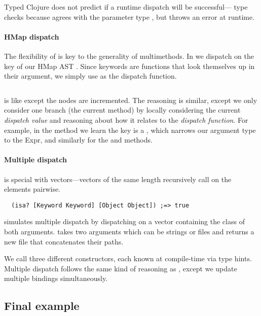 Typed Clojure does not predict if a runtime dispatch will be successful--- 
type checks because  agrees with the parameter type ,
but throws an error at runtime.

\paragraph{HMap dispatch} The flexibility of  is key to the generality of multimethods. 
In  we
dispatch on the  key 
of our HMap AST .
Since keywords are functions that look themselves up in their argument, we simply
use  as the dispatch function.

\begin{exmp}
\inputminted[firstline=5,lastline=18]{clojure}{code/demo/src/demo/eg5.clj}
\label{example:incmap}
\end{exmp}

 is like  except the nodes are incremented.
The reasoning is similar, except we only consider one branch (the current method) by
locally considering the current \emph{dispatch value} and reasoning about how it relates
to the \emph{dispatch function}.
For example, 
in the  method we learn the  key is a , which
narrows our argument type to the  Expr, and similarly for the 
and  methods.

\paragraph{Multiple dispatch}  is special with vectors---vectors of the
same length recursively call  on the elements pairwise.
\begin{verbatim}
  (isa? [Keyword Keyword] [Object Object]) ;=> true
\end{verbatim}

simulates multiple dispatch by dispatching on
a vector containing the class of both arguments. 
takes two arguments which can be strings or files and returns
a new file that concatenates their paths.

We call three different  constructors, each known at compile-time
via type hints.
Multiple dispatch follows the same kind of reasoning as ,
except we update multiple bindings simultaneously.

\subsection{Final example}

